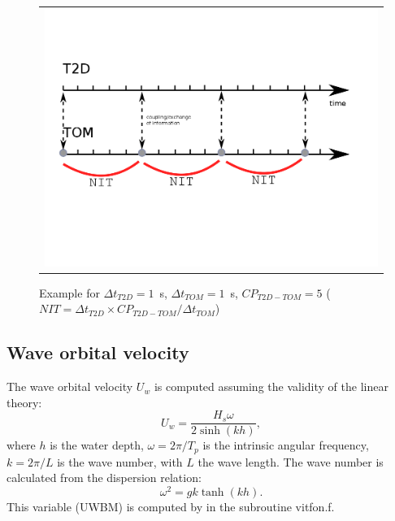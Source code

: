 \begin{figure}[H]%
  \begin{center}
    \begin{tabular}{c}
      \includegraphics[scale=0.30]{./graphics/coupling_2.png}
    \end{tabular}
    \caption{Example for $\Delta t_{T2D}=1$~s, $\Delta t_{TOM}=1$~s, $CP_{T2D-TOM}=5$ ($NIT=\Delta t_{T2D}\times CP_{T2D-TOM}/\Delta t_{TOM}$)}
\end{center}
\end{figure}


\subsection{Wave orbital velocity}
The wave orbital velocity $U_w$ is computed assuming the validity of the linear theory:
\begin{equation*}
U_w=\frac{H_s \omega }{2 \sinh (kh)},
\end{equation*}
where $h$ is the water depth, $\omega = 2\pi/T_p$ is the intrinsic angular frequency, $k = 2\pi/L$ is the wave number, with $L$ the wave length. The wave number is calculated from the dispersion relation:
\begin{equation*}
\omega^2 = gk\tanh (kh).
\end{equation*}
This variable ({\ttfamily UWBM}) is computed by \tomawac{} in the subroutine {\ttfamily vitfon.f}.

